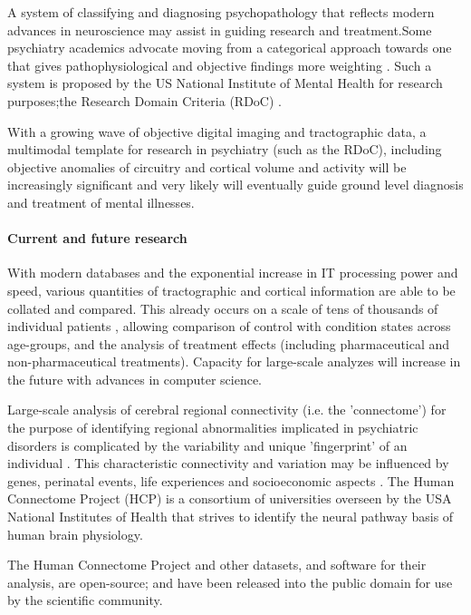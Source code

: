 A system of classifying and diagnosing psychopathology that reflects modern advances in neuroscience may assist in guiding research and treatment.Some psychiatry academics advocate moving from a categorical approach towards one that gives pathophysiological and objective findings more weighting . Such a system is proposed by the US National Institute of Mental Health for research purposes;the Research Domain Criteria (RDoC) .

With a growing wave of objective digital imaging and tractographic data, a multimodal template for research in psychiatry (such as the RDoC), including objective anomalies of circuitry and cortical volume and activity will be increasingly significant and very likely will eventually guide ground level diagnosis and treatment of mental illnesses.

\paragraph{Current and future research}

With modern databases and the exponential increase in IT processing power and speed, various quantities of tractographic and cortical information are able to be collated and compared. This already occurs on a scale of tens of thousands of individual patients , allowing comparison of control with condition states across age-groups, and the analysis of treatment effects (including pharmaceutical and non-pharmaceutical treatments). Capacity for large-scale analyzes will increase in the future with advances in computer science.

Large-scale analysis of cerebral regional connectivity (i.e. the 'connectome') for the purpose of identifying regional abnormalities implicated in psychiatric disorders is complicated by the variability and unique 'fingerprint' of an individual . This characteristic connectivity and variation may be influenced by genes, perinatal events, life experiences and socioeconomic aspects . The Human Connectome Project (HCP) is a consortium of universities overseen by the USA National Institutes of Health that strives to identify the neural pathway basis of human brain physiology.

The Human Connectome Project and other datasets, and software for their analysis, are open-source; and have been released into the public domain for use by the scientific community.